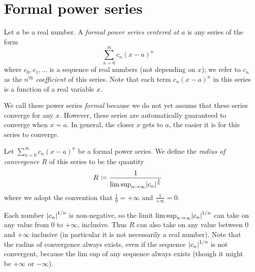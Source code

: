\section{Formal power series}\label{sec 4.1}

\begin{definition}\label{4.1.1}
    Let \(a\) be a real number.
    A \emph{formal power series centered at \(a\)} is any series of the form
    \[
        \sum_{n = 0}^\infty c_n (x - a)^n
    \]
    where \(c_0, c_1, \dots\) is a sequence of real numbers (not depending on \(x\));
    we refer to \(c_n\) as the \emph{\(n^{\text{th}}\) coefficient} of this series.
    Note that each term \(c_n (x - a)^n\) in this series is a function of a real variable \(x\).
\end{definition}

\begin{note}
    We call these power series \emph{formal} because we do not yet assume that these series converge for any \(x\).
    However, these series are automatically guaranteed to converge when \(x = a\).
    In general, the closer \(x\) gets to \(a\), the easier it is for this series to converge.
\end{note}

\setcounter{theorem}{2}
\begin{definition}\label{4.1.3}
    Let \(\sum_{n = 0}^\infty c_n (x - a)^n\) be a formal power series.
    We define the \emph{radius of convergence \(R\)} of this series to be the quantity
    \[
        R \coloneqq \frac{1}{\limsup_{n \to \infty} \abs*{c_n}^{\frac{1}{n}}}
    \]
    where we adopt the convention that \(\frac{1}{0} = +\infty\) and \(\frac{1}{+\infty} = 0\).
\end{definition}

\begin{remark}\label{4.1.4}
    Each number \(\abs*{c_n}^{1 / n}\) is non-negative, so the limit \(\limsup_{n \to \infty} \abs*{c_n}^{1 / n}\) can take on any value from \(0\) to \(+\infty\), inclusive.
    Thus \(R\) can also take on any value between \(0\) and \(+\infty\) inclusive
    (in particular it is not necessarily a real number).
    Note that the radius of convergence always exists, even if the sequence \(\abs*{c_n}^{1 / n}\) is not convergent, because the lim sup of any sequence always exists
    (though it might be \(+\infty\) or \(-\infty\)).
\end{remark}

